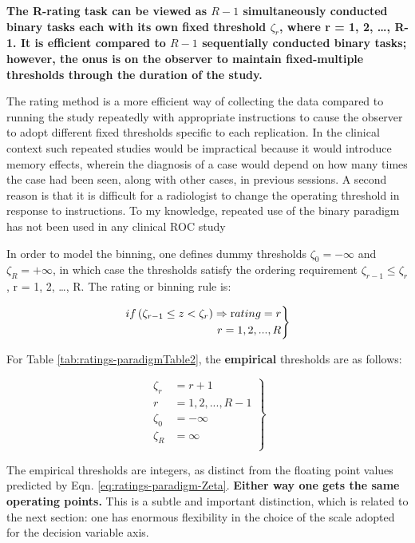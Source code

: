 \documentclass[
]{book}
\begin{document}
\textbf{The R-rating task can be viewed as \(R-1\) simultaneously conducted binary tasks each with its own fixed threshold \(\zeta_r\), where r = 1, 2, \ldots, R-1. It is efficient compared to \(R-1\) sequentially conducted binary tasks; however, the onus is on the observer to maintain fixed-multiple thresholds through the duration of the study.}

The rating method is a more efficient way of collecting the data compared to running the study repeatedly with appropriate instructions to cause the observer to adopt different fixed thresholds specific to each replication. In the clinical context such repeated studies would be impractical because it would introduce memory effects, wherein the diagnosis of a case would depend on how many times the case had been seen, along with other cases, in previous sessions. A second reason is that it is difficult for a radiologist to change the operating threshold in response to instructions. To my knowledge, repeated use of the binary paradigm has not been used in any clinical ROC study

In order to model the binning, one defines dummy thresholds \(\zeta_0 = - \infty\) and \(\zeta_R = + \infty\), in which case the thresholds satisfy the ordering requirement \(\zeta_{r-1} \le \zeta_r\) , r = 1, 2, \ldots, R. The rating or binning rule is:

\begin{equation}
\left.
\begin{aligned}  
if \left (\zeta_{r-1} \le z < \zeta_r  \right )\Rightarrow \text rating = r\\
r = 1, 2, ..., R
\end{aligned}
\right \}
\label{eq:ratings-paradigm-binningRule}
\end{equation}

For Table \ref{tab:ratings-paradigmTable2}, the \textbf{empirical} thresholds are as follows:

\begin{equation} 
\left.
\begin{aligned}
\zeta_r &= r + 1 \\
r & = 1, 2, ..., R-1\\
\zeta_0 &= -\infty\\
\zeta_R &= \infty\\
\end{aligned}
\right \}
\label{eq:ratings-paradigm-EmpZeta}
\end{equation}

The empirical thresholds are integers, as distinct from the floating point values predicted by Eqn. \eqref{eq:ratings-paradigm-Zeta}. \textbf{Either way one gets the same operating points.} This is a subtle and important distinction, which is related to the next section: one has enormous flexibility in the choice of the scale adopted for the decision variable axis.
\end{document}
